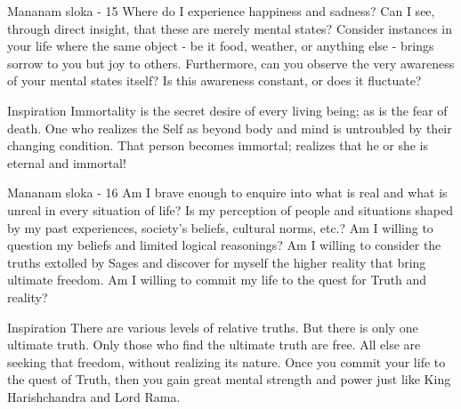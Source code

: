 \newpage
\begin{mananam}{\mananamfont Mananam sloka - 15}
\mananamtext Where do I experience happiness and sadness? Can I see, through direct insight, that these are merely mental states? Consider instances in your life where the same object - be it food, weather, or anything else - brings sorrow to you but joy to others. Furthermore, can you observe the very awareness of your mental states itself? Is this awareness constant, or does it fluctuate? 
\end{mananam}
\WritingHand{}
\begin{inspiration}{\mananamfont Inspiration}
\mananamtext Immortality is the secret desire of every living being; as is the fear of death. One who realizes the Self as beyond body and mind is untroubled by their changing condition. That person becomes immortal; realizes that he or she is eternal and immortal!  
\end{inspiration}
\newpage

\newpage
\begin{mananam}{\mananamfont Mananam sloka - 16}
\mananamtext Am I brave enough to enquire into what is real and what is unreal in every situation of life? Is my perception of people and situations shaped by my past experiences, society’s beliefs, cultural norms, etc.? Am I willing to question my beliefs and limited logical reasonings? Am I willing to consider the truths extolled by Sages and discover for myself the higher reality that bring ultimate freedom. Am I willing to commit my life to the quest for Truth and reality?
\end{mananam}
\WritingHand{}
\begin{inspiration}{\mananamfont Inspiration}
\mananamtext There are various levels of relative truths. But there is only one ultimate truth. Only those who find the ultimate truth are free. All else are seeking that freedom, without realizing its nature. Once you commit your life to the quest of Truth, then you gain great mental strength and power just like King Harishchandra and Lord Rama.
\end{inspiration}
\newpage

